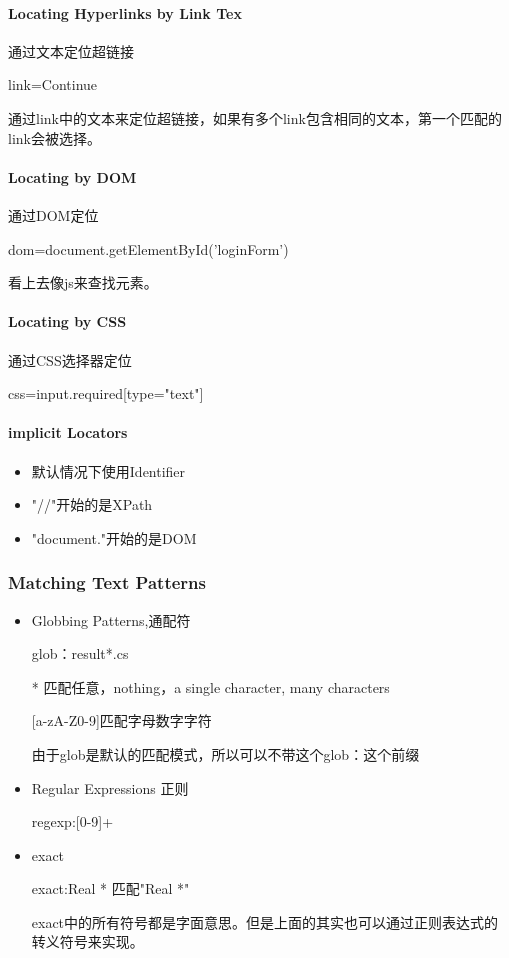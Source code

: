 \paragraph{Locating Hyperlinks by Link Tex} 通过文本定位超链接

link=Continue

通过link中的文本来定位超链接，如果有多个link包含相同的文本，第一个匹配的link会被选择。

\paragraph{Locating by DOM} 通过DOM定位

dom=document.getElementById('loginForm')

看上去像js来查找元素。

\paragraph{Locating by CSS} 通过CSS选择器定位

css=input.required[type="text"]

\paragraph{implicit Locators}
\begin{itemize}
\item 默认情况下使用Identifier
\item "//"开始的是XPath
\item "document."开始的是DOM
\end{itemize}

\subsubsection{Matching Text Patterns}
\begin{itemize}
\item Globbing Patterns,通配符

glob：result*.cs

* 匹配任意，nothing，a single character, many characters

[a-zA-Z0-9]匹配字母数字字符

由于glob是默认的匹配模式，所以可以不带这个glob：这个前缀

\item Regular Expressions 正则

regexp:[0-9]+

\item exact

exact:Real * 匹配"Real *"

exact中的所有符号都是字面意思。但是上面的其实也可以通过正则表达式的转义符号来实现。

\end{itemize}

